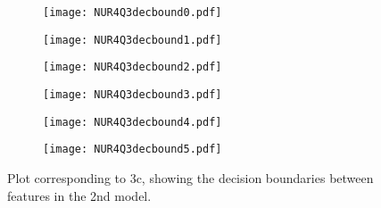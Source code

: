 \begin{figure}[ht]
     \begin{subfigure}{.49\textwidth}
       \centering
    \texttt{[image: NUR4Q3decbound0.pdf]}
    \centering
    \label{}
    \end{subfigure}
    \begin{subfigure}{.49\textwidth}
       \centering
    \texttt{[image: NUR4Q3decbound1.pdf]}
    \centering
    \label{}
    \end{subfigure}
    \hfill
    \begin{subfigure}{.49\textwidth}
       \centering
    \texttt{[image: NUR4Q3decbound2.pdf]}
    \centering
    \label{}
    \end{subfigure}
     \begin{subfigure}{.49\textwidth}
       \centering
    \texttt{[image: NUR4Q3decbound3.pdf]}
    \centering
    \label{}
    \end{subfigure}
     \begin{subfigure}{.49\textwidth}
       \centering
    \texttt{[image: NUR4Q3decbound4.pdf]}
    \centering
    \label{}
    \end{subfigure}
         \begin{subfigure}{.49\textwidth}
       \centering
    \texttt{[image: NUR4Q3decbound5.pdf]}
    \centering
    \label{}
    \end{subfigure}
    \caption{Plot corresponding to 3c, showing the decision boundaries between features in the 2nd model.}
    \label{fig:fig6}
\end{figure}


